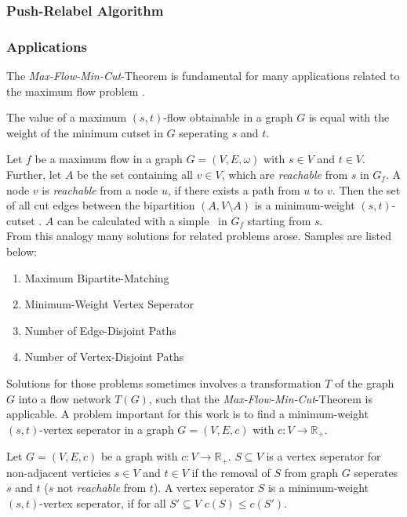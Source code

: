 \subsubsection{Push-Relabel Algorithm}
\label{sec:push_relabel}

\subsubsection{Applications}
\label{sec:applications}

The \emph{Max-Flow-Min-Cut}-Theorem is fundamental for many applications related to the maximum
flow problem \cite{ford1956maximal}.

\begin{theorem}
The value of a maximum $(s,t)$-flow obtainable in a graph $G$ is equal with the weight
of the minimum cutset in $G$ seperating $s$ and $t$.
\end{theorem}

Let $f$ be a maximum flow in a graph $G = (V,E,\omega)$ with $s \in V$ and $t \in V$. 
Further, let $A$ be the set containing all $v \in V$, which are \emph{reachable} from $s$
in $G_f$. A node $v$ is \emph{reachable} from a node $u$, if there exists a path from $u$
to $v$. Then the set of all cut edges between the bipartition $(A,V\setminus A)$ 
is a minimum-weight $(s,t)$-cutset \cite{ford2015flows}. $A$ can be calculated with a simple \BFS~in $G_f$ starting
from $s$. \\
From this analogy many solutions for related problems arose. Samples are listed below:
\begin{enumerate}
\item Maximum Bipartite-Matching
\item Minimum-Weight Vertex Seperator
\item Number of Edge-Disjoint Paths
\item Number of Vertex-Disjoint Paths
\end{enumerate}
Solutions for those problems sometimes involves a transformation $T$ of the graph $G$
into a flow network $T(G)$, such that the \emph{Max-Flow-Min-Cut}-Theorem is applicable. 
A problem important for this work is to find a minimum-weight $(s,t)$-vertex seperator
in a graph $G = (V,E,c)$ with $c: V \rightarrow \mathbb{R}_+$.

\begin{definition}
Let $G = (V,E,c)$ be a graph with $c: V \rightarrow \mathbb{R}_+$. $S \subseteq V$
is a vertex seperator for non-adjacent verticies $s \in V$ and $t \in V$ if the
removal of $S$ from graph $G$ seperates $s$ and $t$ ($s$ not \emph{reachable} from $t$).
A vertex seperator $S$ is a minimum-weight $(s,t)$-vertex seperator, if for all $S' \subseteq V$
$c(S) \le c(S')$.
\end{definition}

